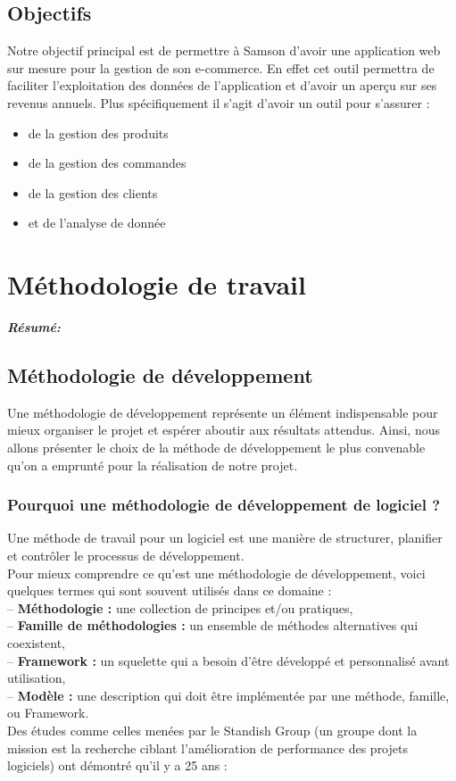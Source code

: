 \documentclass[a4paper, 12pt]{report}
\begin{document}
\subsection{Objectifs}
{Notre objectif principal est de permettre à Samson d’avoir une application web sur mesure pour la gestion de son e-commerce. En effet cet outil permettra de faciliter l’exploitation des données de l’application et d’avoir un aperçu sur ses revenus annuels. Plus spécifiquement il s’agit d’avoir un outil pour s’assurer :
\begin{itemize}
  \item de la gestion des produits 
  \item de la gestion des commandes
  \item de la gestion des clients
  \item et de l'analyse de donnée
\end{itemize} 
}

\section{ Méthodologie de travail}
\textit{\textbf{Résumé:} }
\setcounter{minitocdepth}{1}
\minitoc

\subsection{Méthodologie de développement}
Une méthodologie de développement représente un élément indispensable pour mieux organiser le projet et espérer aboutir aux résultats attendus. Ainsi, nous allons présenter le choix de la méthode de développement le plus convenable qu’on a emprunté pour la réalisation de notre projet. 
\subsubsection{Pourquoi une méthodologie de développement de logiciel ?}
Une méthode de travail pour un logiciel est une manière de structurer, planifier et contrôler le processus de développement. 
\\
Pour mieux comprendre ce qu'est une méthodologie de développement, voici quelques termes qui sont souvent utilisés dans ce domaine : \\
-- \textbf{Méthodologie :} une collection de principes et/ou pratiques,\\ 
-- \textbf{Famille de méthodologies :} un ensemble de méthodes alternatives qui coexistent,\\
-- \textbf{Framework :} un squelette qui a besoin d'être développé et personnalisé avant utilisation,\\ 
-- \textbf{Modèle :} une description qui doit être implémentée par une méthode, famille, ou Framework.\\
Des études comme celles menées par le Standish Group (un groupe dont la mission est la recherche ciblant l’amélioration de performance des projets logiciels) ont démontré qu’il y a 25 ans : 
\end{document}
